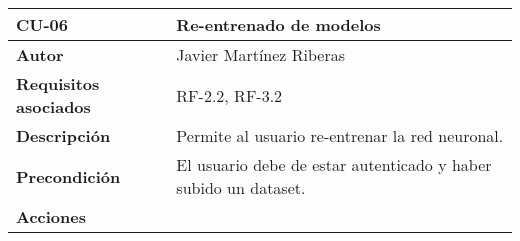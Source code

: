 \begin{longtable}[H]{@{}ll@{}}
\toprule
\begin{minipage}[b]{0.26\columnwidth}\raggedright\strut%
\textbf{CU-06}\strut
\end{minipage} & \begin{minipage}[b]{0.68\columnwidth}\raggedright\strut%
\textbf{Re-entrenado de modelos}\strut
\end{minipage}\tabularnewline
\midrule
\endhead
\begin{minipage}[t]{0.26\columnwidth}\raggedright\strut
\textbf{Autor}\strut
\end{minipage} & \begin{minipage}[t]{0.68\columnwidth}\raggedright\strut
Javier Martínez Riberas\strut
\end{minipage}\tabularnewline
\begin{minipage}[t]{0.26\columnwidth}\raggedright\strut
\textbf{Requisitos asociados}\strut
\end{minipage} & \begin{minipage}[t]{0.68\columnwidth}\raggedright\strut%
RF-2.2, RF-3.2\strut
\end{minipage}\tabularnewline
\begin{minipage}[t]{0.26\columnwidth}\raggedright\strut
\textbf{Descripción}\strut
\end{minipage} & \begin{minipage}[t]{0.68\columnwidth}\raggedright\strut%
Permite al usuario re-entrenar la red neuronal.\strut
\end{minipage}\tabularnewline
\begin{minipage}[t]{0.26\columnwidth}\raggedright\strut
\textbf{Precondición}\strut
\end{minipage} & \begin{minipage}[t]{0.68\columnwidth}\raggedright\strut%
El usuario debe de estar autenticado y haber subido un dataset.\strut
\end{minipage}\tabularnewline
\begin{minipage}[t]{0.26\columnwidth}\raggedright\strut
\textbf{Acciones}\strut
\end{minipage} & \begin{minipage}[t]{0.68\columnwidth}\raggedright\strut%

\end{minipage}
\end{longtable}
